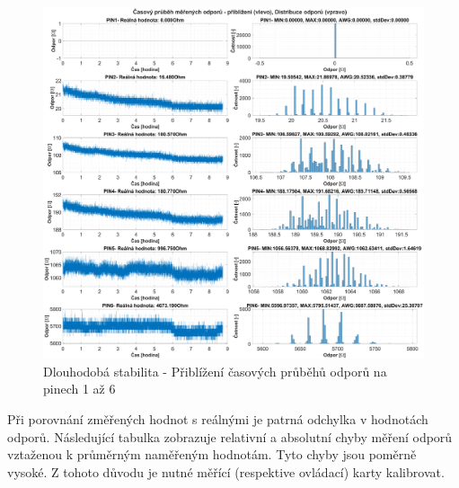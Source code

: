 \clearpage
\begin{figure}[ht!]
    \centering
    \includegraphics[width = 1\textwidth]{obrazky/matlab_generated/VOLTAGE_TESTER/dlouhodoba_stabilita_resistor_part1.eps}
    \caption{Dlouhodobá stabilita - Přiblížení časových průběhů odporů na pinech 1 až 6}
    \label{fig: 10hourTest Resistor PINS1TO4}
\end{figure}

Při porovnání změřených hodnot s reálnými je patrná odchylka v hodnotách odporů. Následující tabulka zobrazuje relativní a absolutní
chyby měření odporů vztaženou k průměrným naměřeným hodnotám. Tyto chyby jsou poměrně vysoké.
Z tohoto důvodu je nutné měřící (respektive ovládací) karty kalibrovat.

\begin{table}[ht!]
    \centering
    \caption{Chyby měření odporů vůči pinu č. 1 nezkalibrované měřící karty}
    \label{tab:chyby mereni necal}
    \end{table}

